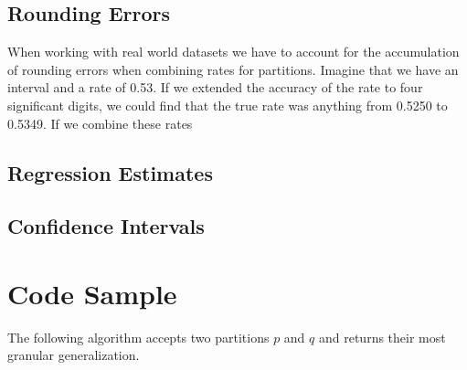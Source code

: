 \documentclass[]{article}
\begin{document}
\hypertarget{rounding-errors}{%
\subsection{Rounding Errors}\label{rounding-errors}}

When working with real world datasets we have to account for the
accumulation of rounding errors when combining rates for partitions.
Imagine that we have an interval and a rate of 0.53. If we extended the
accuracy of the rate to four significant digits, we could find that the
true rate was anything from 0.5250 to 0.5349. If we combine these rates

\hypertarget{regression-estimates}{%
\subsection{Regression Estimates}\label{regression-estimates}}

\hypertarget{confidence-intervals}{%
\subsection{Confidence Intervals}\label{confidence-intervals}}

\hypertarget{code-sample}{%
\section{Code Sample}\label{code-sample}}

The following algorithm accepts two partitions \(p\) and \(q\) and
returns their most granular generalization.
\end{document}

